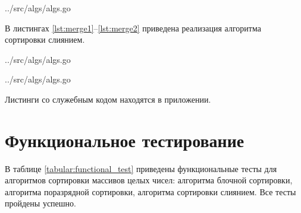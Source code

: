 \begin{lstinputlisting}[
	caption={Продолжение листинга \ref{lst:radix1}},
	label={lst:radix2},
	style={go},
	linerange={114-143},
	]{../src/algs/algs.go}
\end{lstinputlisting}

В листингах \ref{lst:merge1}--\ref{lst:merge2} приведена реализация алгоритма сортировки слиянием.

\begin{lstinputlisting}[
	caption={Алгоритм сортировки слиянием},
	label={lst:merge1},
	style={go},
	linerange={145-155},
	]{../src/algs/algs.go}
\end{lstinputlisting}

\begin{lstinputlisting}[
	caption={Продолжение листинга \ref{lst:merge1}},
	label={lst:merge2},
	style={go},
	linerange={156-173},
	]{../src/algs/algs.go}
\end{lstinputlisting}

Листинги со служебным кодом находятся в приложении.

\section{Функциональное тестирование}

В таблице \ref{tabular:functional_test} приведены функциональные тесты для алгоритмов сортировки массивов целых чисел: алгоритма блочной сортировки, алгоритма поразрядной сортировки, алгоритма сортировки слиянием. Все тесты пройдены успешно.

